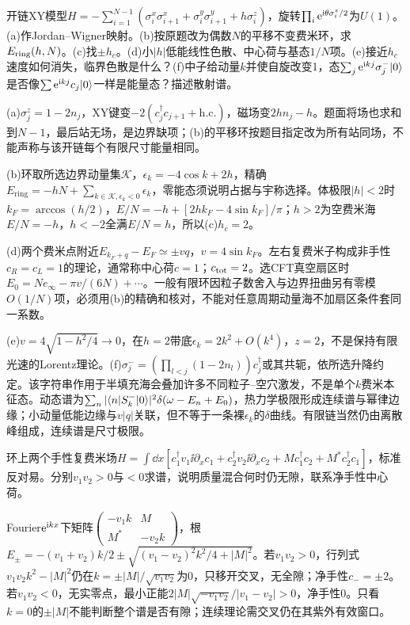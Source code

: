 \begin{exercise}[原题1(a)--(f)]
开链XY模型$H=-\sum_{i=1}^{N-1}(\sigma_i^x\sigma_{i+1}^x+\sigma_i^y\sigma_{i+1}^y+h\sigma_i^z)$，旋转$\prod_i\mathrm e^{\mathrm i\theta\sigma_i^z/2}$为$U(1)$。(a)作Jordan--Wigner映射。(b)按原题改为偶数$N$的平移不变费米环，求$E_{\rm ring}(h,N)$。(c)找$\pm h_c$。(d)小$|h|$低能线性色散、中心荷与基态$1/N$项。(e)接近$h_c$速度如何消失，临界色散是什么？(f)中子给动量$k$并使自旋改变1，态$\sum_j\mathrm e^{\mathrm i kj}\sigma_j^-\lvert 0\rangle$是否像$\sum\mathrm e^{\mathrm i kj}c_j\lvert 0\rangle$一样是能量态？描述散射谱。
\end{exercise}
\begin{solution}
(a)$\sigma_j^z=1-2n_j$，XY键变$-2(c_j^\dagger c_{j+1}+\mathrm{h.c.})$，磁场变$2hn_j-h$。题面将场也求和到$N-1$，最后站无场，是边界缺项；(b)的平移环按题目指定改为所有站同场，不能声称与该开链每个有限尺寸能量相同。

(b)环取所选边界动量集$\mathcal K$，$\epsilon_k=-4\cos k+2h$，精确$E_{\mathrm{ring}}=-hN+\sum_{k\in\mathcal K,\epsilon_k<0}\epsilon_k$，零能态须说明占据与宇称选择。体极限$|h|<2$时$k_F=\arccos(h/2)$，$E/N=-h+[2hk_F-4\sin k_F]/\pi$；$h>2$为空费米海$E/N=-h$，$h<-2$全满$E/N=h$，所以(c)$h_c=2$。

(d)两个费米点附近$E_{k_F+q}-E_F\simeq\pm vq$，$v=4\sin k_F$。左右复费米子构成非手性$c_R=c_L=1$的理论，通常称中心荷$c=1$；$c_{\rm tot}=2$。选CFT真空扇区时$E_0=Ne_\infty-\pi v/(6N)+\cdots$。一般有限环因粒子数舍入与边界扭曲另有零模$O(1/N)$项，必须用(b)的精确和核对，不能对任意周期动量海不加扇区条件套同一系数。

(e)$v=4\sqrt{1-h^2/4}\to0$，在$h=2$带底$\epsilon_k=2k^2+O(k^4)$，$z=2$，不是保持有限光速的Lorentz理论。(f)$\sigma_j^-=(\prod_{l<j}(1-2n_l))c_j^\dagger$或其共轭，依所选升降约定。该字符串作用于半填充海会叠加许多不同粒子--空穴激发，不是单个$k$费米本征态。动态谱为$\sum_n|\langle n|S^-_k|0\rangle|^2\delta(\omega-E_n+E_0)$，热力学极限形成连续谱与幂律边缘；小动量低能边缘与$v|q|$关联，但不等于一条裸$\epsilon_k$的$\delta$曲线。有限链当然仍由离散峰组成，连续谱是尺寸极限。
\end{solution}
\begin{exercise}[原题2]
环上两个手性复费米场$H=\int\dd x[c_1^\dagger v_1\ii\partial_xc_1+c_2^\dagger v_2\ii\partial_xc_2+M c_1^\dagger c_2+M^*c_2^\dagger c_1]$，标准反对易。分别$v_1v_2>0$与$<0$求谱，说明质量混合何时仍无隙，联系净手性中心荷。
\end{exercise}
\begin{solution}
Fourier$\mathrm e^{\mathrm i kx}$下矩阵$\left(\begin{smallmatrix}-v_1k&M\\M^*&-v_2k\end{smallmatrix}\right)$，根$E_\pm=-(v_1+v_2)k/2\pm\sqrt{(v_1-v_2)^2k^2/4+|M|^2}$。若$v_1v_2>0$，行列式$v_1v_2k^2-|M|^2$仍在$k=\pm|M|/\sqrt{v_1v_2}$为0，只移开交叉，无全隙；净手性$c_-=\pm2$。若$v_1v_2<0$，无实零点，最小正能$2|M|\sqrt{-v_1v_2}/|v_1-v_2|>0$，净手性0。只看$k=0$的$\pm|M|$不能判断整个谱是否有隙；连续理论需交叉仍在其紫外有效窗口。
\end{solution}
